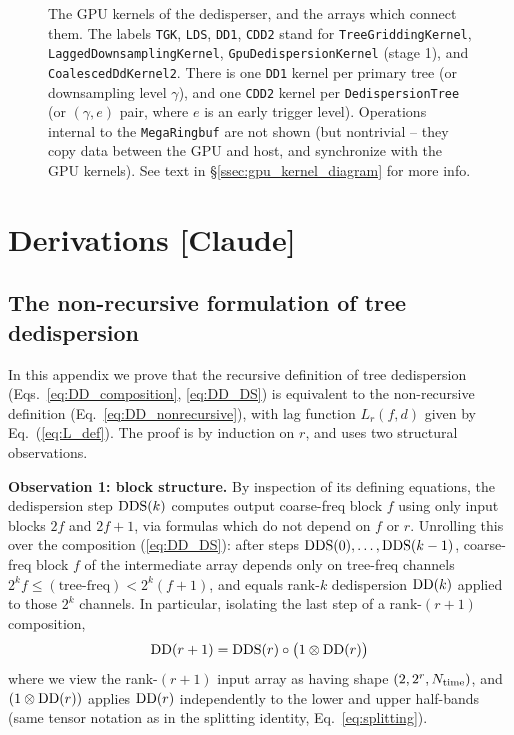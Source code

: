\documentclass{article}
\numberwithin{equation}{section}   %
\def\DDS{{\rm DDS}}
\def\DD{{\rm DD}}
\begin{document}
\begin{figure}[ht]
\begin{tikzpicture}
\end{tikzpicture}
\caption{The GPU kernels of the dedisperser, and the arrays which connect them.
The labels {\tt TGK}, {\tt LDS}, {\tt DD1}, {\tt CDD2} stand for
{\tt TreeGriddingKernel}, {\tt LaggedDownsamplingKernel},
{\tt GpuDedispersionKernel} (stage 1), and {\tt CoalescedDdKernel2}.
There is one {\tt DD1} kernel per primary tree (or downsampling level $\gamma$),
and one {\tt CDD2} kernel per {\tt DedispersionTree} (or $(\gamma,e)$ pair, where
$e$ is an early trigger level).
Operations internal to the {\tt MegaRingbuf} are not shown (but nontrivial -- they
copy data between the GPU and host, and synchronize with the GPU kernels).
See text in \S\ref{ssec:gpu_kernel_diagram} for more info.}
\label{fig:gpu_kernels}
\end{figure}

\clearpage

\appendix

\section{Derivations [Claude]}
\label{app:derivations}

\subsection{The non-recursive formulation of tree dedispersion}
\label{app:nonrecursive_proof}

In this appendix we prove that the recursive definition of tree dedispersion
(Eqs.\ \ref{eq:DD_composition}, \ref{eq:DD_DS}) is equivalent to the non-recursive definition
(Eq.\ \ref{eq:DD_nonrecursive}), with lag function $L_r(f,d)$ given by Eq.\ (\ref{eq:L_def}).
The proof is by induction on $r$, and uses two structural observations.

\par\noindent
{\bf Observation 1: block structure.}
By inspection of its defining equations, the dedispersion step $\DDS(k)$ computes output
coarse-freq block $f$ using only input blocks $2f$ and $2f+1$, via formulas which do not depend
on $f$ or $r$. Unrolling this over the composition (\ref{eq:DD_DS}): after steps
$\DDS(0), \ldots, \DDS(k-1)$, coarse-freq block $f$ of the intermediate array depends only on
tree-freq channels $2^k f \le (\mbox{tree-freq}) < 2^k (f+1)$, and equals rank-$k$ dedispersion
$\DD(k)$ applied to those $2^k$ channels. In particular, isolating the last step of a
rank-$(r+1)$ composition,
\begin{equation}
\DD(r+1) = \DDS(r) \circ \big( 1 \otimes \DD(r) \big)   \label{eq:app_last_step}
\end{equation}
where we view the rank-$(r+1)$ input array as having shape $(2, 2^r, N_{\rm time})$, and
$(1 \otimes \DD(r))$ applies $\DD(r)$ independently to the lower and upper half-bands
(same tensor notation as in the splitting identity, Eq.\ \ref{eq:splitting}).
\end{document}
